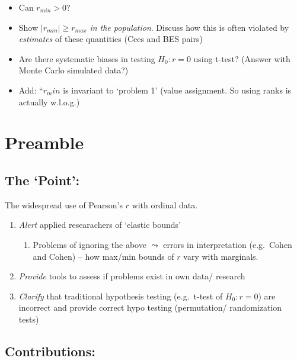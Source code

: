 \documentclass[
  12pt,
]{article}
\providecommand{\tightlist}{%
  \setlength{\itemsep}{0pt}\setlength{\parskip}{0pt}}\usepackage{longtable,booktabs,array}
\theoremstyle{plain}
\theoremstyle{definition}
\theoremstyle{remark}
\begin{document}
\begin{itemize}
\tightlist
\item
  Can \(r_{min} >0\)?
\item
  Show \(|r_{min}| \ge r_{max}\) \emph{in the population}. Discuss how
  this is often violated by \emph{estimates} of these quantities (Cees
  and BES pairs)
\item
  Are there systematic biases in testing \(H_0: r=0\) using t-test?
  (Answer with Monte Carlo simulated data?)
\item
  Add: ``\(r_min\) is invariant to `problem 1' (value assignment. So
  using ranks is actually w.l.o.g.)
\end{itemize}

\section*{Preamble}\label{preamble}

\subsection{The `Point':}\label{the-point}

The widespread use of Pearson's \(r\) with ordinal data.\\

\begin{enumerate}
\def\labelenumi{\arabic{enumi}.}
\tightlist
\item
  \emph{Alert} applied researachers of `elastic bounds'

  \begin{enumerate}
  \def\labelenumii{\arabic{enumii}.}
  \tightlist
  \item
    Problems of ignoring the above \(\leadsto\) errors in interpretation
    (e.g.~Cohen and Cohen) -- how max/min bounds of \(r\) vary with
    marginals.\\
  \end{enumerate}
\item
  \emph{Provide} tools to assess if problems exist in own data/ research
\item
  \emph{Clarify} that traditional hypothesis testing (e.g.~t-test of
  \(H_0: r= 0\)) are incorrect and provide correct hypo testing
  (permutation/ randomization tests)
\end{enumerate}

\subsection{Contributions:}\label{contributions}
\end{document}
